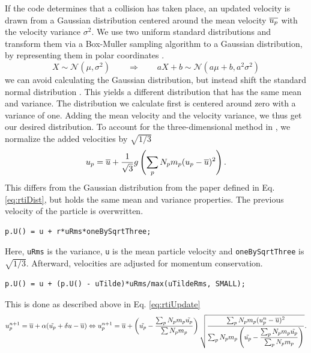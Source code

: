 If the code determines that a collision has taken place, an updated velocity is drawn from a Gaussian distribution centered around the mean velocity $\overline{u_p}$ with the velocity variance $\sigma^2$.
We use two uniform standard distributions and transform them via a Box-Muller %
sampling algorithm to a Gaussian distribution, by representing them in polar coordinates
\cite{numericalRecipies}.
\begin{equation}
    X \sim \mathcal{N}(\mu , \sigma^2) \qquad \Rightarrow \qquad aX+b \sim \mathcal{N} (a \mu + b, a^2 \sigma^2)
\end{equation}
we can avoid calculating the Gaussian distribution, but instead shift the standard normal distribution \cite{Stochastic}.
This yields a different distribution that has the same mean and variance.
The distribution we calculate first is centered around zero with a variance of one. Adding the mean velocity and the velocity variance, we thus get our desired distribution.
To account for the three-dimensional method in \OFns, we normalize the added velocities by $\sqrt{1/3}$
\begin{equation}
    u_p = \overline{u} + \dfrac{1}{\sqrt{3}} g \left( \sum_p N_p m_p (u_p - \overline{u})^2\right).
\end{equation}
This differs from the Gaussian distribution from the paper defined in Eq. \eqref{eq:rtiDist}, but holds the same mean and variance properties.
The previous velocity of the particle is overwritten.
\ifkeepcode
\begin{lstlisting}[caption=intermediate/submodels/MPPIC/IsotropyModels/Stochastic/Stochastic.C]
    p.U() = u + r*uRms*oneBySqrtThree;
\end{lstlisting}
\fi
Here, \lstinline|uRms| is the variance, \lstinline|u| is the mean particle velocity and \lstinline|oneBySqrtThree| is $\sqrt{1/3}$.
Afterward, velocities are adjusted for momentum conservation.
\ifkeepcode
\begin{lstlisting}[caption=intermediate/submodels/MPPIC/IsotropyModels/Stochastic/Stochastic.C]
    p.U() = u + (p.U() - uTilde)*uRms/max(uTildeRms, SMALL);
\end{lstlisting}
\fi
This is done as described above in Eq. \eqref{eq:rtiUpdate}
\begin{equation}
     u_p^{n+1} = \overline{u} + \alpha (\tilde{u_p} + \delta u - \overline{u}) \\
     \Leftrightarrow
     u_p^{n+1} = \overline{u} + \left(\tilde{u_p} - \dfrac{\sum_p N_p m_p \tilde{u_p}}{\sum N_p m_p} \right)\sqrt{\dfrac{\sum_p N_p m_p (u_p^n - \overline{u})^2}{\sum_p N_p m_p \left( \tilde{u_p} - \dfrac{\sum_p N_p m_p \tilde{u_p}}{\sum_p N_p m_p}\right)}}.
\end{equation}



